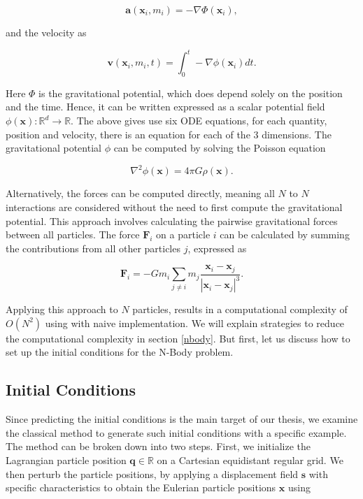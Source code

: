 \documentclass{article}
\begin{document}
\begin{equation}
    \mathbf{a}(\mathbf{x}_i, m_i) = -\nabla \Phi(\mathbf{x}_i),
\end{equation}

and the velocity as

\begin{equation}
    \label{eq:velocity}
    \mathbf{v}(\mathbf{x}_i, m_i, t) = \int_0^{t} -\nabla \phi(\mathbf{x}_i) dt.
\end{equation}

Here $\Phi$ is the gravitational potential, which does depend solely on the position and the time. Hence, it can be written expressed as a scalar potential field $\phi(\mathbf{x}) \colon \mathbb{R}^d \rightarrow \mathbb{R}$. The above gives use six ODE equations, for each quantity, position and velocity, there is an equation for each of the 3 dimensions. The gravitational potential $\phi$ can be computed by solving the Poisson equation

\begin{equation}    
    \label{eq:potential-poisson}
    \nabla^2 \phi(\mathbf{x}) = 4 \pi G \rho(\mathbf{x}).
\end{equation}


Alternatively, the forces can be computed directly, meaning all \(N\) to \(N\) interactions are considered without the need to first compute the gravitational potential. This approach involves calculating the pairwise gravitational forces between all particles. The force \(\mathbf{F}_i\) on a particle \(i\) can be calculated by summing the contributions from all other particles \(j\), expressed as

\begin{equation}
    \mathbf{F}_i = -G m_i \sum_{j \neq i} m_j \frac{\mathbf{x}_i - \mathbf{x}_j}{|\mathbf{x}_i - \mathbf{x}_j|^3}.
\end{equation}

Applying this approach to \(N\) particles, results in a computational complexity of \(O(N^2)\) using with naive implementation. We will explain strategies to reduce the computational complexity in section \ref{nbody}. But first, let us discuss how to set up the initial conditions for the N-Body problem.

\subsection{Initial Conditions}

Since predicting the initial conditions is the main target of our thesis, we examine the classical method to generate such initial conditions with a specific example. The method can be broken down into two steps. First, we initialize the Lagrangian particle position $\mathbf{q} \in \mathbb{R}$ on a Cartesian equidistant regular grid. We then perturb the particle positions, by applying a displacement field $\mathbf{s}$ with specific characteristics to obtain the Eulerian particle positions $\mathbf{x}$ using \citep{bertschinger1995cosmics}
\end{document}
